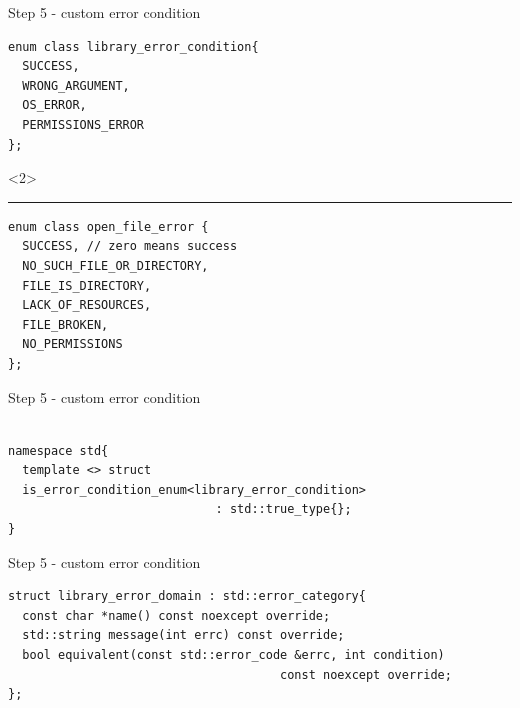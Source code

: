 \documentclass[10pt]{beamer}
\begin{document}
\begin{frame}[fragile]{Step 5 - custom error condition}
	\begin{verbatim}
enum class library_error_condition{
  SUCCESS,
  WRONG_ARGUMENT,
  OS_ERROR,
  PERMISSIONS_ERROR
};
	\end{verbatim}

	\begin{onlyenv}
	\hrule
	\vfill

	\begin{verbatim}
enum class open_file_error {
  SUCCESS, // zero means success
  NO_SUCH_FILE_OR_DIRECTORY,
  FILE_IS_DIRECTORY,
  LACK_OF_RESOURCES,
  FILE_BROKEN,
  NO_PERMISSIONS
};
	\end{verbatim}

	\end{onlyenv}

\end{frame}

\begin{frame}[fragile]{Step 5 - custom error condition}
	\begin{verbatim}

namespace std{
  template <> struct
  is_error_condition_enum<library_error_condition>
                             : std::true_type{};
}
	\end{verbatim}
\end{frame}

\begin{frame}[fragile]{Step 5 - custom error condition}
	\begin{verbatim}
struct library_error_domain : std::error_category{
  const char *name() const noexcept override;
  std::string message(int errc) const override;
  bool equivalent(const std::error_code &errc, int condition) 
                                      const noexcept override;
};
	\end{verbatim}
\end{frame}
\end{document}
